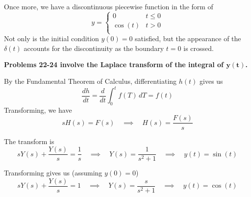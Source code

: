 \documentclass[a4paper]{article}
\begin{document}
Once more, we have a discontinuous piecewise function in the form of
\[
	y = 
	\begin{cases}
		0 & t \le 0 \\
		\cos\!\left( t \right) & t > 0 \\
	\end{cases}
\]
Not only is the initial condition \( y \!\left( 0 \right) = 0 \) satisfied, but the appearance of the \( \delta \!\left( t \right) \) accounts for the discontinuity as the boundary \( t = 0 \) is crossed.

\vspace{12pt}

\textbf{Problems 22-24 involve the Laplace transform of the integral of \( \pmb{y \!\left( t \right)} \).}

\vspace{12pt}


By the Fundamental Theorem of Calculus, differentiating \( h \!\left( t \right) \) gives us
\[
	\frac{d h }{d t } = \frac{d }{d t } \int^{t }_{0} f \!\left( T \right) \, dT = f \!\left( t \right)  
\]
Transforming, we have
\[
	sH \!\left( s \right) = F \!\left( s \right) \quad \implies \quad H \!\left( s \right) = \frac{F \!\left( s \right)}{s} 
\]


The transform is
\[
	s Y \!\left( s \right) + \frac{Y \!\left( s \right)}{s} = \frac{1}{s} \quad \implies \quad Y \!\left( s \right) = \frac{1}{s^{2} + 1} \quad \implies \quad y \!\left( t \right) = \sin\!\left( t \right) 
\]


Transforming gives us (assuming \( y \!\left( 0 \right) = 0 \))
\[
	sY \!\left( s \right) + \frac{Y \!\left( s \right)}{s} = 1 \quad \implies \quad Y \!\left( s \right) = \frac{s}{s^{2} + 1} \quad \implies \quad y \!\left( t \right) = \cos\!\left( t \right)  
\]
\end{document}
